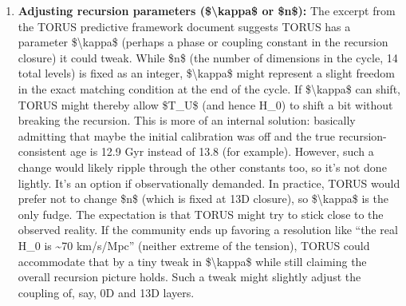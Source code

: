 \documentclass[
]{article}
\begin{document}
{\begin{enumerate}
  upcoming surveys of the \textbf{redshift range z \textasciitilde{}
  1--4} (like those by \emph{JWST} and future extremely large
  telescopes, or SN Ia at high z) could see if the dark energy
  equation-of-state deviates from w = --1 (the \LambdaCDM value). If TORUS's
  recursion causes a slight evolution of w (say from --1 to --0.95 or
  something at late times), it could reconcile the
  H_{0}{} values.
  Observations of the \emph{expansion rate as a function of redshift},
  E(z), via cosmic chronometers or future gravitational wave ``standard
  sirens,'' could detect this deviation. A specific \textbf{prediction}
  might be: TORUS expects an effective equation-of-state for dark energy
  that is slightly less negative than --1 in the recent past (meaning a
  little extra push, which would raise
  H_{0}{} inferred from
  local data)\hspace{0pt}. If surveys find that the best-fit w is
  indeed, say, --0.9 or --0.95, that could be a sign of such physics
  (though it could also be many other models; still, TORUS would be
  among them).
\item
  \textbf{Adjusting recursion parameters (\$\textbackslash kappa\$ or
  \$n\$):} The excerpt from the TORUS predictive framework document
  suggests TORUS has a parameter \$\textbackslash kappa\$ (perhaps a
  phase or coupling constant in the recursion closure) it could
  tweak\hspace{0pt}. While \$n\$ (the number of dimensions in the cycle,
  14 total levels) is fixed as an integer, \$\textbackslash kappa\$
  might represent a slight freedom in the exact matching condition at
  the end of the cycle. If \$\textbackslash kappa\$ can shift, TORUS
  might thereby allow \$T\_U\$ (and hence
  H_{0}) to shift a bit
  without breaking the recursion. This is more of an internal solution:
  basically admitting that maybe the initial calibration was off and the
  true recursion-consistent age is 12.9 Gyr instead of 13.8 (for
  example). However, such a change would likely ripple through the other
  constants too, so it's not done lightly. It's an option if
  observationally demanded. In practice, TORUS would prefer not to
  change \$n\$ (which is fixed at 13D closure), so
  \$\textbackslash kappa\$ is the only fudge. The expectation is that
  TORUS might try to stick close to the observed reality. If the
  community ends up favoring a resolution like ``the real
  H_{0}{} is
  \textasciitilde70 km/s/Mpc'' (neither extreme of the tension), TORUS
  could accommodate that by a tiny tweak in \$\textbackslash kappa\$
  while still claiming the overall recursion picture holds\hspace{0pt}.
  Such a tweak might slightly adjust the coupling of, say, 0D and 13D
  layers.
\end{enumerate}

}
\end{document}
